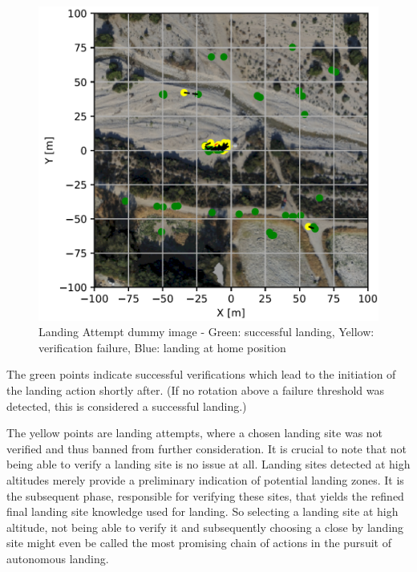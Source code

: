 \begin{figure}[h]
    \begin{center}
        \includegraphics[scale=0.5]{images/evaluation/landings_random_WP_GT.png}
        \caption{Landing Attempt dummy image - Green: successful landing, Yellow: verification failure, Blue: landing at home position}
        \label{fig:landing_attempts_dummy}
    \end{center}
\end{figure}

The green points indicate successful verifications which lead to the initiation of the landing action shortly after. (If no rotation above a failure threshold was detected, this is considered a successful landing.) 

The yellow points are landing attempts, where a chosen landing site was not verified and thus banned from further consideration. It is crucial to note that not being able to verify a landing site is no issue at all. Landing sites detected at high altitudes merely provide a preliminary indication of potential landing zones. It is the subsequent phase, responsible for verifying these sites, that yields the refined final landing site knowledge used for landing. So selecting a landing site at high altitude, not being able to verify it and subsequently choosing a close by landing site might even be called the most promising chain of actions in the pursuit of autonomous landing.

